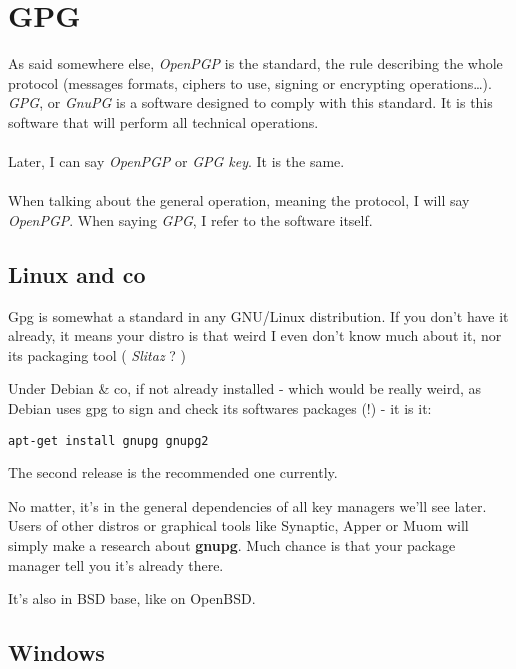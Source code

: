 \section{GPG}\label{gpg}

\begin{notice}
As said somewhere else, \emph{OpenPGP} is the standard, the rule describing the whole protocol (messages formats, ciphers to use, signing or encrypting operations…). \emph{GPG}, or \emph{GnuPG} is a software designed to comply with this standard. It is this software that will perform all technical operations.\\
\\
Later, I can say \emph{OpenPGP} or \emph{GPG key}. It is the same.\\
\\
When talking about the general operation, meaning the protocol, I will say \emph{OpenPGP}. When saying \emph{GPG}, I refer to the software itself.
\end{notice}

\subsection{Linux and co}\label{linux-and-co}

Gpg is somewhat a standard in any GNU/Linux distribution. If you don't have it already, it means your distro is that weird I even don't know
much about it, nor its packaging tool ( \emph{Slitaz} ? )

Under Debian \& co, if not already installed - which would be really weird, as Debian uses gpg to sign and check its softwares packages (!) - it is it:

\begin{lstlisting}
apt-get install gnupg gnupg2
\end{lstlisting}

The second release is the recommended one currently.

No matter, it's in the general dependencies of all key managers we'll
see later. Users of other distros or graphical tools like Synaptic, Apper or Muom will simply make a research about \textbf{gnupg}. Much chance is that
your package manager tell you it's already there.

It's also in BSD base, like on OpenBSD.

\subsection{Windows}\label{windows}

